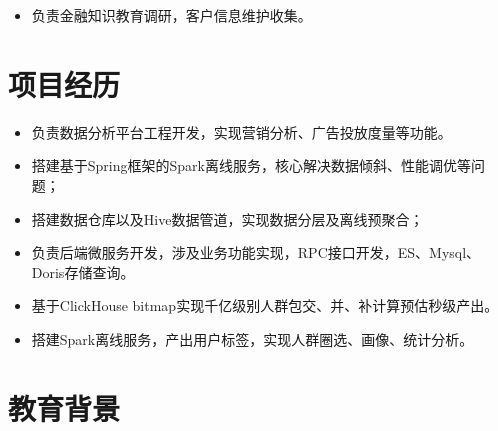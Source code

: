 \documentclass{resume}
\begin{document}
\begin{itemize}
  \item 负责金融知识教育调研，客户信息维护收集。
\end{itemize}

\section{项目经历}
\begin{itemize}
  \item 负责数据分析平台工程开发，实现营销分析、广告投放度量等功能。
  \item 搭建基于Spring框架的Spark离线服务，核心解决数据倾斜、性能调优等问题；
  \item 搭建数据仓库以及Hive数据管道，实现数据分层及离线预聚合；
  \item 负责后端微服务开发，涉及业务功能实现，RPC接口开发，ES、Mysql、Doris存储查询。
\end{itemize}

\begin{itemize}
  \item 基于ClickHouse bitmap实现千亿级别人群包交、并、补计算预估秒级产出。
  \item 搭建Spark离线服务，产出用户标签，实现人群圈选、画像、统计分析。
\end{itemize}

\section{教育背景}
\end{document}
